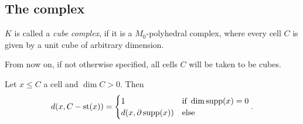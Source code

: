 \subsection{The complex}
\label{sec:complex}


\begin{defin}
  \(K\) is called a \emph{cube complex}, if it is a \(M_0\)-polyhedral complex, where every cell \(C\) is given by a unit cube of arbitrary dimension.
\end{defin}

From now on, if not otherwise specified, all cells \(C\) will be taken to be cubes.

\begin{lemma}
  \label{lemma:cube-dist}
  Let \(x \leq C\) a cell and \(\dim C > 0\). Then
  \begin{align*}
    d(x, C - \operatorname{st}(x)) =
    \begin{cases}
      1 & \text{if } \dim \operatorname{supp}(x) = 0\\
      d(x, \partial \operatorname{supp}(x)) & \text{else}
    \end{cases}
                         .
  \end{align*}
\end{lemma}

